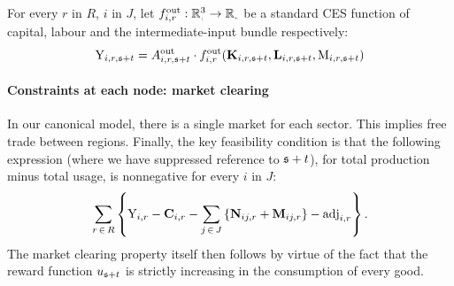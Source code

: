\documentclass[12pt,a4paper,twoside, draft]{article}
\begin{document}
For every $r$ in $R$, $i$ in $J$, let
$f_{i, r}^{\textup{out}}: \nnreal^{3} \rightarrow \nnreal$ be a standard
CES function of capital, labour and the intermediate-input bundle respectively:
\begin{equation}
	\textup{Y}_{i, r, \mathfrak{s} + t}
    = A_{i, r, \mathfrak{s} + t}^{\textup{out}} \cdot f_{i, r}
      ^ \textup{out}(
        \mathbf{K}_{i, r, \mathfrak{s} + t},
        \mathbf{L}_{i, r, \mathfrak{s} + t},
        \textup{M}_{i, r, \mathfrak{s} + t}
        )
\end{equation}
\paragraph{Constraints at each node: market clearing}
In our canonical model, there is a single market for each sector.
This implies free trade between regions.
Finally, the key feasibility condition is that the following expression (where
we have suppressed reference to $\mathfrak{s} + t$), for total production minus total
usage, is nonnegative for every $i$ in $J$:
\begin{equation}
  \sum_{r \,\in\, R} \left\{
  \textup{Y}_{i, r}
  - \mathbf{C}_{i, r}
  - \sum_{j \,\in\, J}
      \left\{\mathbf{N}_{ij, r} + \mathbf{M}_{ij, r}\right\}
  - \textup{adj}_{i, r} \right\}.
\end{equation}
The market clearing property itself then follows by virtue of the fact that
the reward function $u_{\mathfrak{s} + t}$ is strictly increasing in the
consumption of every good.
\end{document}
